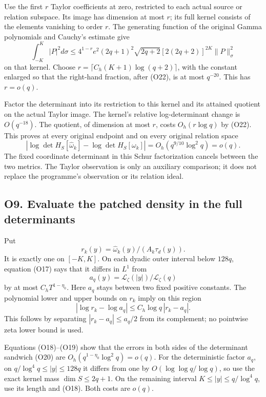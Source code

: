 Use the first \(r\) Taylor coefficients at zero, restricted to each
actual source or relation subspace. Its image has dimension at most
\(r\); its full kernel consists of the elements vanishing to order
\(r\). The generating function of the original Gamma polynomials and
Cauchy's estimate give \[
\int_{-K}^{K}|P|^2d\sigma
\le4^{1-r}e^2(2q+1)^2\sqrt{2q+2}
[2(2q+2)]^{2K}\|P\|_\sigma^2
\tag{O23}
\] on that kernel. Choose \(r=\lceil C_h(K+1)\log(q+2)\rceil\), with the
constant enlarged so that the right-hand fraction, after (O22), is at
most \(q^{-20}\). This has \(r=o(q)\).

Factor the determinant into its restriction to this kernel and its
attained quotient on the actual Taylor image. The kernel's relative
log-determinant change is \(O(q^{-18})\). The quotient, of dimension at
most \(r\), costs \(O_h(r\log q)\) by (O22). This proves at every
original endpoint and on every original relation space \[
|\log\det H_S[\widehat\omega_k]-\log\det H_S[\omega_k]|
=O_h(q^{9/10}\log^2q)=o(q).\tag{O24}
\] The fixed coordinate determinant in this Schur factorization cancels
between the two metrics. The Taylor observation is only an auxiliary
comparison; it does not replace the programme's observation or its
relation ideal.

\subsection{O9. Evaluate the patched density in the full
determinants}\label{sa:o9.-evaluate-the-patched-density-in-the-full-determinants}

Put \[
r_k(y)=\widehat\omega_k(y)/(A_k\tau_d(y)).
\] It is exactly one on \([-K,K]\). On each dyadic outer interval below
\(128q\), equation (O17) says that it differs in \(L^1\) from \[
a_q(y)=\mathcal L_\zeta(|y|)/\mathcal L_\zeta(q)
\] by at most \(C_hT^{1-\eta_0}\). Here \(a_q\) stays between two fixed
positive constants. The polynomial lower and upper bounds on \(r_k\)
imply on this region \[
|\log r_k-\log a_q|\le C_h\log q\,|r_k-a_q|.\tag{O25}
\] This follows by separating \(|r_k-a_q|\le a_q/2\) from its
complement; no pointwise zeta lower bound is used.

Equations (O18)--(O19) show that the errors in both sides of the
determinant sandwich (O20) are \(O_h(q^{1-\eta_0}\log^2q)=o(q)\). For
the deterministic factor \(a_q\), on \(q/\log^4q\le|y|\le128q\) it
differs from one by \(O(\log\log q/\log q)\), so use the exact kernel
mass \(\dim S\le2q+1\). On the remaining interval
\(K\le|y|\le q/\log^4q\), use its length and (O18). Both costs are
\(o(q)\).


